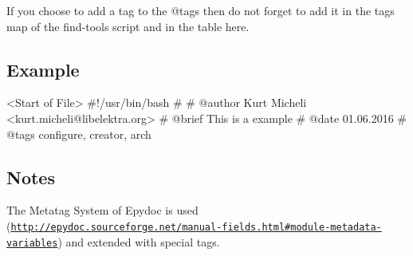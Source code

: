 If you choose to add a tag to the {\ttfamily @tags} then do not forget to add it in the tags map of the {\ttfamily find-\/tools} script and in the table here.

\subsection*{Example}

\begin{DoxyVerb}        <Start of File>
        #!/usr/bin/bash
        #
        # @author Kurt Micheli <kurt.micheli@libelektra.org>
        # @brief This is a example
        # @date 01.06.2016
        # @tags configure, creator, arch\end{DoxyVerb}


\subsection*{Notes}

The Metatag System of Epydoc is used (\href{http://epydoc.sourceforge.net/manual-fields.html#module-metadata-variables}{\tt http\+://epydoc.\+sourceforge.\+net/manual-\/fields.\+html\#module-\/metadata-\/variables}) and extended with special tags. 